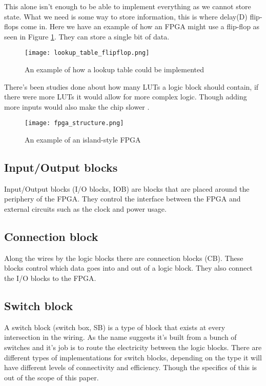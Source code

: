 This alone isn't enough to be able to implement everything as we cannot store
state. What we need is some way to store information, this is where delay(D)
flip-flops come in. Here we have an example of how an FPGA might use a
flip-flop as seen in Figure \ref{fig:lut_flipflop}. They can store a single bit
of data.

\begin{figure}[H]
    \centering
    \texttt{[image: lookup\_table\_flipflop.png]}
    \caption{An example of how a lookup table could be implemented \citep{M.MorrisMano3}}
    \label{fig:lut_flipflop}
\end{figure}

There's been studies done about how many LUTs a logic block should contain, if
there were more LUTs it would allow for more complex logic. Though adding more
inputs would also make the chip slower \citep{HideharuAmano8}.

\begin{figure}[H]
    \centering
    \label{fig:fpga_structure}
    \texttt{[image: fpga\_structure.png]}
    \caption{An example of an island-style FPGA\citep{M.MorrisMano3}}
\end{figure}

\subsection{Input/Output blocks}
Input/Output blocks (I/O blocks, IOB) are blocks that are placed around the
periphery of the FPGA. They control the interface between the FPGA and external
circuits such as the clock and power usage.

\subsection{Connection block}
Along the wires by the logic blocks there are connection blocks (CB). These blocks
control which data goes into and out of a logic block. They also connect the
I/O blocks to the FPGA.

\subsection{Switch block}
A switch block (switch box, SB) is a type of block that exists at every
intersection in the wiring. As the name suggests it's built from a bunch of
switches and it's job is to route the electricity between the logic blocks.
There are different types of implementations for switch blocks, depending on
the type it will have different levels of connectivity and efficiency. Though
the specifics of this is out of the scope of this paper.

